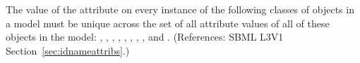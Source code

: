 The value of the  attribute on every instance of the following
classes of objects in a model must be unique across the set of all
 attribute values of all of these objects in the model: \Model,
\FunctionDefinition, \Compartment, \Species, \Reaction, \SpeciesReference,
\ModifierSpeciesReference, \Event, and \Parameter.  (References: SBML
L3V1 Section~\ref{sec:idnameattribs}.)
